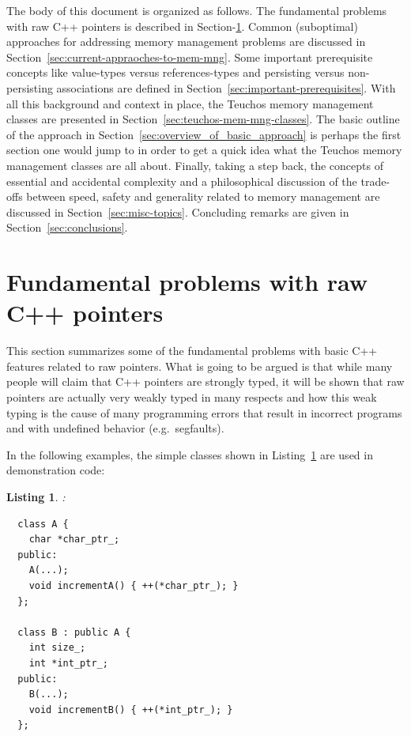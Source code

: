 \documentclass[pdf,ps2pdf,11pt]{SANDreport}
\newtheorem{listing}{Listing}
\begin{document}
The body of this document is organized as follows. The fundamental
problems with raw C++ pointers is described in
Section-\ref{sec:problems-with-raw-pointers}.  Common (suboptimal)
approaches for addressing memory management problems are discussed in
Section~\ref{sec:current-appraoches-to-mem-mng}.  Some important
prerequisite concepts like value-types versus references-types and
persisting versus non-persisting associations are defined in
Section~\ref{sec:important-prerequisites}.  With all this background
and context in place, the Teuchos memory management classes are
presented in Section~\ref{sec:teuchos-mem-mng-classes}.  The basic
outline of the approach in
Section~\ref{sec:overview_of_basic_approach} is perhaps the first
section one would jump to in order to get a quick idea what the
Teuchos memory management classes are all about.  Finally, taking a
step back, the concepts of essential and accidental complexity and a
philosophical discussion of the trade-offs between speed, safety and
generality related to memory management are discussed in
Section~\ref{sec:misc-topics}.  Concluding remarks are given in
Section~\ref{sec:conclusions}.


%
{}\section{Fundamental problems with raw C++ pointers}
\label{sec:problems-with-raw-pointers}
%

This section summarizes some of the fundamental problems with basic
C++ features related to raw pointers.  What is going to be argued is
that while many people will claim that C++ pointers are strongly
typed, it will be shown that raw pointers are actually very weakly
typed in many respects and how this weak typing is the cause of many
programming errors that result in incorrect programs and with
undefined behavior (e.g.\ segfaults).

In the following examples, the simple classes shown in
Listing~\ref{listing:Simple_A_B} are used in demonstration code:

\begin{listing}:\\
\label{listing:Simple_A_B}
{\small\begin{verbatim}
  class A {
    char *char_ptr_;
  public:
    A(...);
    void incrementA() { ++(*char_ptr_); }
  };

  class B : public A {
    int size_;
    int *int_ptr_;
  public:
    B(...);
    void incrementB() { ++(*int_ptr_); }
  };
\end{verbatim}}
\end{listing}
\end{document}
